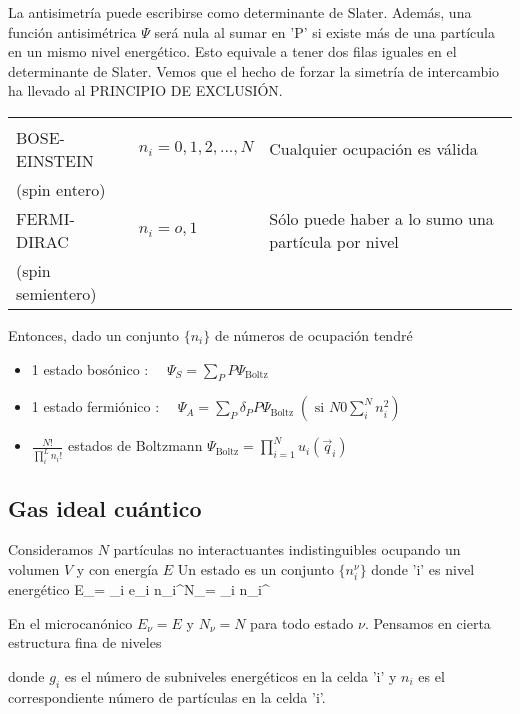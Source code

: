 \documentclass[10pt,oneside]{CBFT_book}
\begin{document}
La antisimetría puede escribirse como determinante de Slater. Además, una función antisimétrica $\Psi$ será nula 
al sumar en 'P' si existe más de una partícula en un mismo nivel energético. Esto equivale a tener dos filas
iguales en el determinante de Slater.
Vemos que el hecho de forzar la simetría de intercambio ha llevado al PRINCIPIO DE EXCLUSIÓN.

\begin{center}
\begin{tabular}{|l|l|l|}
\hline
 & & \\
BOSE-EINSTEIN & $ n_i = 0,1,2, ... , N $ & Cualquier ocupación es válida \\
 (spin entero) & & \\
FERMI-DIRAC  & $ n_i = o, 1 $ & Sólo puede haber a lo sumo una partícula por nivel \\
 (spin semientero) & & \\
\hline
\end{tabular}
\end{center}

Entonces, dado un conjunto $ \{ n_i \} $ de números de ocupación tendré 

\begin{itemize}
\item 1 estado bosónico : $ \quad \Psi_S = \sum_P P \Psi_{\text{Boltz}}$
\item 1 estado fermiónico : $ \quad \Psi_A = \sum_P \delta_P P \Psi_{\text{Boltz}} 
	\; (\text{ si } N 0 \sum_i^N n_i^2 )$
\item $ \frac{N!}{\prod_i^L n_i!} $ estados de Boltzmann $ \Psi_{\text{Boltz}} = \prod_{i=1}^N u_i(\vec{q}_i) $
\end{itemize}


\subsection{Gas ideal cuántico}

Consideramos $N$ partículas no interactuantes indistinguibles ocupando un volumen $V$ y con energía $E$
Un estado es un conjunto $ \{ n_i^\nu \} $ donde 'i' es nivel energético
\be
	E_\nu = \sum_i e_i n_i^\nu \qquad \qquad N_\nu = \sum_i n_i^\nu
	\label{cond_EN}
\ee

En el microcanónico $ E_\nu = E $ y $ N_\nu = N $ para todo estado $\nu$. Pensamos en cierta estructura 
fina de niveles


donde $g_i$ es el número de subniveles energéticos en la celda 'i' y $n_i$ es el correspondiente número de
partículas en la celda 'i'.
\end{document}
